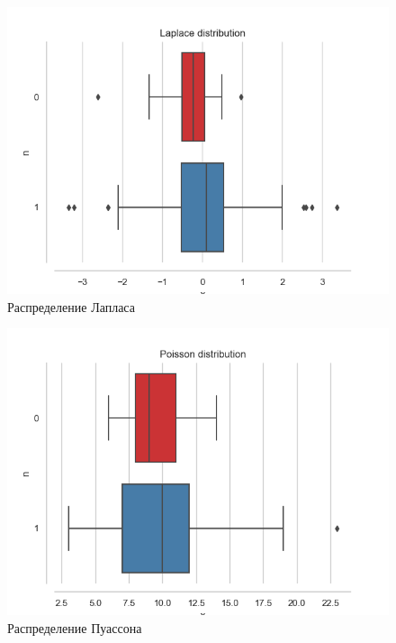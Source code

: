 \documentclass[../main.tex]{subfiles}
\begin{document}
    \begin{figure}[H]
        \centering
        \includegraphics[scale=0.8]{figures/LaplaceBoxplot.png}
        \caption{Распределение Лапласа}
        \label{fig:normal}
    \end{figure}
    
     \begin{figure}[H]
        \centering
        \includegraphics[scale=0.8]{figures/PoissonBoxplot.png}
        \caption{Распределение Пуассона}
        \label{fig:normal}
    \end{figure}
    
\end{document}
